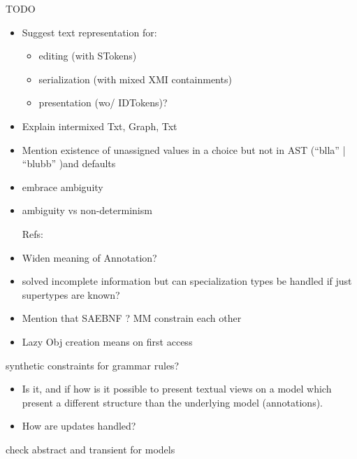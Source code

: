 TODO
\begin{itemize}
	\item Suggest text representation for: 
	\begin{itemize}
		\item editing (with STokens)
		\item serialization (with mixed XMI containments)
		\item presentation (wo/ IDTokens)?
	\end{itemize}
	
	\item Explain intermixed Txt, Graph, Txt
	\item Mention existence of unassigned values in a choice but not in AST (``blla'' | ``blubb'' )and defaults

	\item embrace ambiguity
	\item ambiguity vs non-determinism

	

Refs:
	\item Widen meaning of Annotation?
	\item solved incomplete information but can specialization types be handled if just supertypes are known? 
	\item Mention that SAEBNF ? MM constrain each other
	\item Lazy Obj creation means on first access
	\end{itemize}

synthetic constraints for grammar rules?

\begin{itemize}
	\item Is it, and if how is it possible to present textual views on a model which present a different structure than the underlying model (annotations).
		\item  How are updates handled?
\end{itemize}

check abstract and transient for models 